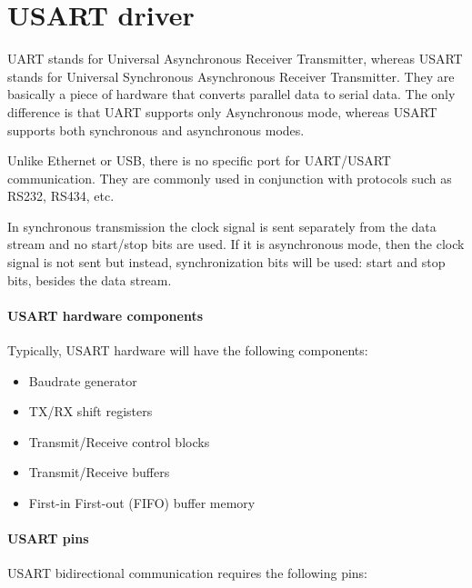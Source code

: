 \chapter{USART driver}

UART stands for Universal Asynchronous Receiver Transmitter, whereas USART stands for Universal Synchronous Asynchronous Receiver Transmitter. They are basically a piece of hardware that converts parallel data to serial data. The only difference is that UART supports only Asynchronous mode, whereas USART supports both synchronous and asynchronous modes.

\noindent Unlike Ethernet or USB, there is no specific port for UART/USART communication. They are commonly used in conjunction with protocols such as RS232, RS434, etc.

\noindent In synchronous transmission the clock signal is sent separately from the data stream and no start/stop bits are used. If it is asynchronous mode, then the clock signal is not sent but instead, synchronization bits will be used: start and stop bits, besides the data stream.

\subsubsection{USART hardware components}
Typically, USART hardware will have the following components:

\begin{itemize}
	\item	Baudrate generator
	\item	TX/RX shift registers
	\item	Transmit/Receive control blocks
	\item	Transmit/Receive buffers
	\item	First-in First-out (FIFO) buffer memory
\end{itemize}

\subsubsection{USART pins}
USART bidirectional communication requires the following pins:


